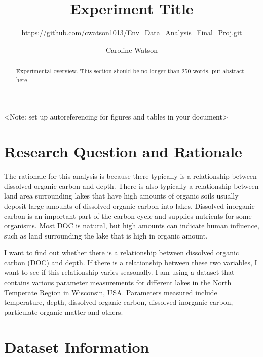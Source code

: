 \documentclass[12pt,]{article}
\title{Experiment Title}
\subtitle{\url{https://github.com/cwatson1013/Env_Data_Analysis_Final_Proj.git}}
\author{Caroline Watson}
\date{}
\newenvironment{Shaded}{\begin{snugshade}}{\end{snugshade}}
\newcommand{\KeywordTok}[1]{\textcolor[rgb]{0.13,0.29,0.53}{\textbf{#1}}}
\newcommand{\StringTok}[1]{\textcolor[rgb]{0.31,0.60,0.02}{#1}}
\newcommand{\CommentTok}[1]{\textcolor[rgb]{0.56,0.35,0.01}{\textit{#1}}}
\newcommand{\OperatorTok}[1]{\textcolor[rgb]{0.81,0.36,0.00}{\textbf{#1}}}
\newcommand{\NormalTok}[1]{#1}
\begin{document}
\maketitle
\begin{abstract}
Experimental overview. This section should be no longer than 250 words.
put abstract here
\end{abstract}

{
\setcounter{tocdepth}{3}
\tableofcontents
}
\newpage

\tableofcontents  \newpage
\listoftables  \newpage
\listoffigures  \newpage

\textless{}Note: set up autoreferencing for figures and tables in your
document\textgreater{}

\section{Research Question and
Rationale}\label{research-question-and-rationale}

The rationale for this analysis is because there typically is a
relationship between dissolved organic carbon and depth. There is also
typically a relationship between land area surrounding lakes that have
high amounts of organic soils usually deposit large amounts of dissolved
organic carbon into lakes. Dissolved inorganic carbon is an important
part of the carbon cycle and supplies nutrients for some organisms. Most
DOC is natural, but high amounts can indicate human influence, such as
land surrounding the lake that is high in organic amount.

I want to find out whether there is a relationship between dissolved
organic carbon (DOC) and depth. If there is a relationship between these
two variables, I want to see if this relationship varies seasonally. I
am using a dataset that contains various parameter measurements for
different lakes in the North Temperate Region in Wisconsin, USA.
Parameters measured include temperature, depth, dissolved organic
carbon, dissolved inorganic carbon, particulate organic matter and
others.

\newpage

\section{Dataset Information}\label{dataset-information}

\begin{Shaded}
\end{Shaded}
\end{document}
